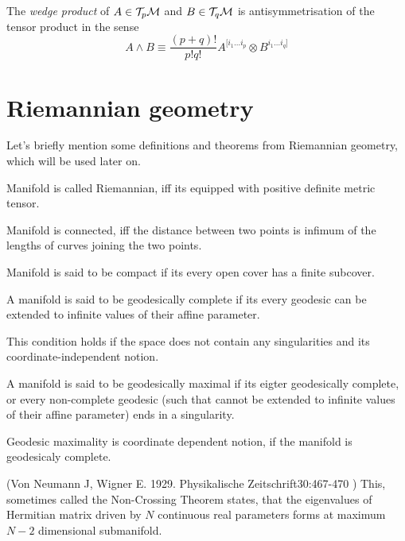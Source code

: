 The \emph{wedge product} of $A\in \mathcal{T}_p \mathcal{M}$ and $B\in \mathcal{T}_q \mathcal{M}$ is antisymmetrisation of the tensor product in the sense
\begin{equation}
    A\wedge B\equiv \frac{(p+q)!}{p!q!} A^{[i_1\dots i_p}\otimes B^{i_1\dots i_q]}
\end{equation}

\section{Riemannian geometry}
Let's briefly mention some definitions and theorems from Riemannian geometry, which will be used later on.
\begin{definition}
    Manifold is called Riemannian, iff its equipped with positive definite metric tensor.
\end{definition}
\begin{definition}
    Manifold is connected, iff the distance between two points is infimum of the lengths of curves joining the two points.
\end{definition}
\begin{definition}
    Manifold is said to be compact if its every open cover has a finite subcover.
\end{definition}
\begin{definition}
    A manifold is said to be geodesically complete if its every geodesic can be extended to infinite values of their affine parameter. 
\end{definition}
This condition holds if the space does not contain any singularities and its coordinate-independent notion.
\begin{definition}
    A manifold is said to be geodesically maximal if its eigter geodesically complete, or every non-complete geodesic (such that cannot be extended to infinite values of their affine parameter) ends in a singularity.
\end{definition}
Geodesic maximality is coordinate dependent notion, if the manifold is geodesicaly complete.


\begin{thm}
    \label{thm:n-2}
(Von Neumann J, Wigner E. 1929. Physikalische Zeitschrift30:467-470 )
This, sometimes called the Non-Crossing Theorem states, that the eigenvalues of Hermitian matrix driven by $N$ continuous real parameters forms at maximum $N-2$ dimensional submanifold.
\end{thm}


